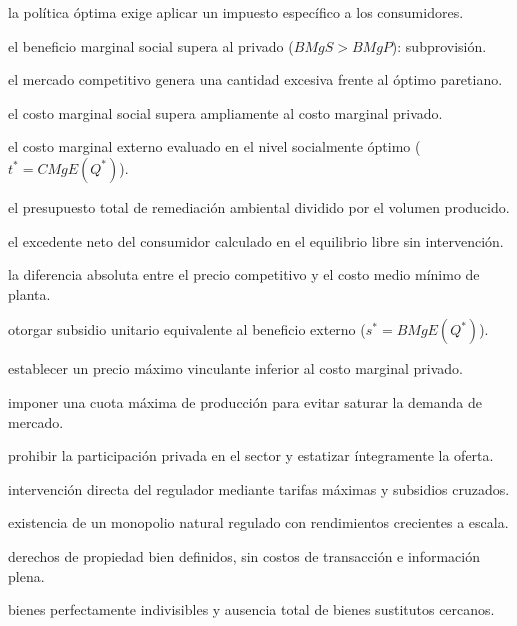 \begin{opts}
    \item la política óptima exige aplicar un impuesto específico a los consumidores.
    \item el beneficio marginal social supera al privado ($BMgS > BMgP$): subprovisión.
    \item el mercado competitivo genera una cantidad excesiva frente al óptimo paretiano.
    \item el costo marginal social supera ampliamente al costo marginal privado.
\end{opts}

\begin{opts}
    \item el costo marginal externo evaluado en el nivel socialmente óptimo ($t^* = CMgE(Q^*)$).
    \item el presupuesto total de remediación ambiental dividido por el volumen producido.
    \item el excedente neto del consumidor calculado en el equilibrio libre sin intervención.
    \item la diferencia absoluta entre el precio competitivo y el costo medio mínimo de planta.
\end{opts}

\begin{opts}
    \item otorgar subsidio unitario equivalente al beneficio externo ($s^* = BMgE(Q^*)$).
    \item establecer un precio máximo vinculante inferior al costo marginal privado.
    \item imponer una cuota máxima de producción para evitar saturar la demanda de mercado.
    \item prohibir la participación privada en el sector y estatizar íntegramente la oferta.
\end{opts}

\begin{opts}
    \item intervención directa del regulador mediante tarifas máximas y subsidios cruzados.
    \item existencia de un monopolio natural regulado con rendimientos crecientes a escala.
    \item derechos de propiedad bien definidos, sin costos de transacción e información plena.
    \item bienes perfectamente indivisibles y ausencia total de bienes sustitutos cercanos.
\end{opts}

